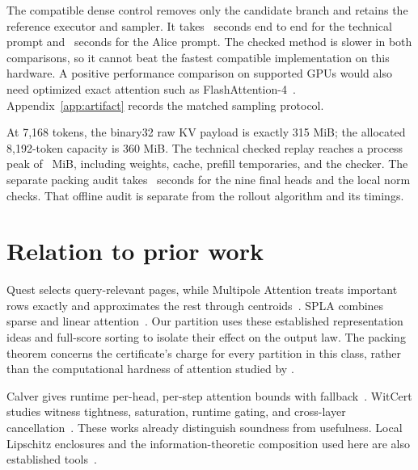 \documentclass[10pt]{article}
\theoremstyle{definition}\newtheorem{definition}[theorem]{Definition}
\begin{document}
The compatible dense control removes only the candidate branch and retains the reference executor and sampler. It takes \TechBase\ seconds end to end for the technical prompt and \LitBase\ seconds for the Alice prompt. The checked method is slower in both comparisons, so it cannot beat the fastest compatible implementation on this hardware. A positive performance comparison on supported GPUs would also need optimized exact attention such as FlashAttention-4~\citep{fa4}. Appendix~\ref{app:artifact} records the matched sampling protocol.

At 7,168 tokens, the binary32 raw KV payload is exactly 315 MiB; the allocated 8,192-token capacity is 360 MiB. The technical checked replay reaches a process peak of \TechRSS\ MiB, including weights, cache, prefill temporaries, and the checker. The separate packing audit takes \PackingSeconds\ seconds for the nine final heads and the local norm checks. That offline audit is separate from the rollout algorithm and its timings.

\section{Relation to prior work}
\label{sec:related}
Quest selects query-relevant pages, while Multipole Attention treats important rows exactly and approximates the rest through centroids~\citep{quest,multipole}. SPLA combines sparse and linear attention~\citep{spla}. Our partition uses these established representation ideas and full-score sorting to isolate their effect on the output law. The packing theorem concerns the certificate's charge for every partition in this class, rather than the computational hardness of attention studied by \citet{alman}.

Calver gives runtime per-head, per-step attention bounds with fallback~\citep{calver}. WitCert studies witness tightness, saturation, runtime gating, and cross-layer cancellation~\citep{witcert}. These works already distinguish soundness from usefulness. Local Lipschitz enclosures and the information-theoretic composition used here are also established tools~\citep{local,hoeffding1963,cover2006}.
\end{document}
